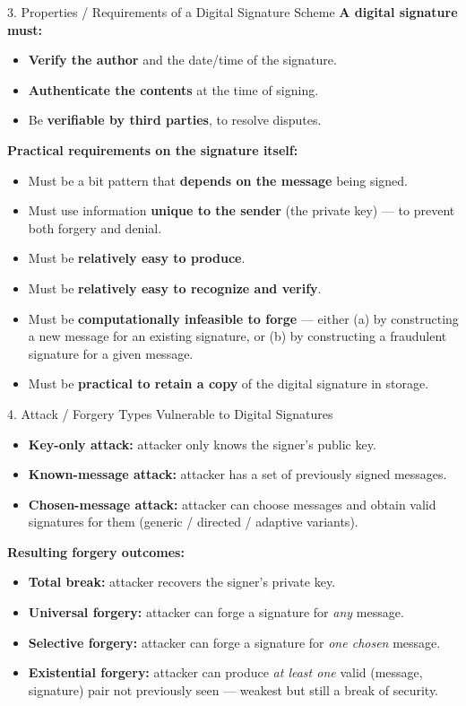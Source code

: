 \documentclass[12pt,a4paper]{article}
\begin{document}
\begin{algobox}{3. Properties / Requirements of a Digital Signature Scheme}
\textbf{A digital signature must:}
\begin{itemize}[noitemsep]
  \item \textbf{Verify the author} and the date/time of the signature.
  \item \textbf{Authenticate the contents} at the time of signing.
  \item Be \textbf{verifiable by third parties}, to resolve disputes.
\end{itemize}
\textbf{Practical requirements on the signature itself:}
\begin{itemize}[noitemsep]
  \item Must be a bit pattern that \textbf{depends on the message} being signed.
  \item Must use information \textbf{unique to the sender} (the private key) --- to prevent both forgery and denial.
  \item Must be \textbf{relatively easy to produce}.
  \item Must be \textbf{relatively easy to recognize and verify}.
  \item Must be \textbf{computationally infeasible to forge} --- either (a) by constructing a new message for an existing signature, or (b) by constructing a fraudulent signature for a given message.
  \item Must be \textbf{practical to retain a copy} of the digital signature in storage.
\end{itemize}
\end{algobox}

\begin{algobox}{4. Attack / Forgery Types Vulnerable to Digital Signatures}
\begin{itemize}[noitemsep]
  \item \textbf{Key-only attack:} attacker only knows the signer's public key.
  \item \textbf{Known-message attack:} attacker has a set of previously signed messages.
  \item \textbf{Chosen-message attack:} attacker can choose messages and obtain valid signatures for them (generic / directed / adaptive variants).
\end{itemize}
\textbf{Resulting forgery outcomes:}
\begin{itemize}[noitemsep]
  \item \textbf{Total break:} attacker recovers the signer's private key.
  \item \textbf{Universal forgery:} attacker can forge a signature for \emph{any} message.
  \item \textbf{Selective forgery:} attacker can forge a signature for \emph{one chosen} message.
  \item \textbf{Existential forgery:} attacker can produce \emph{at least one} valid (message, signature) pair not previously seen --- weakest but still a break of security.
\end{itemize}
\end{algobox}
\end{document}
